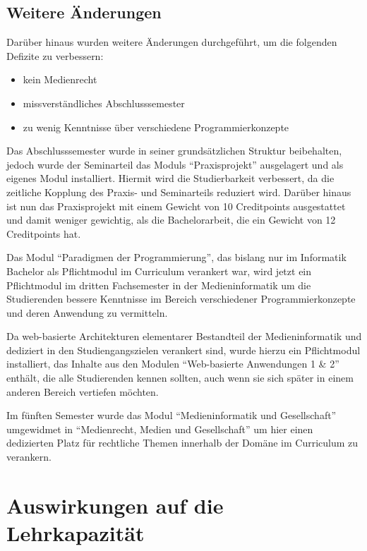 \subsection{Weitere Änderungen}\label{weitere-uxe4nderungen}

Darüber hinaus wurden weitere Änderungen durchgeführt, um die folgenden
Defizite zu verbessern:

\begin{itemize}
\tightlist
\item
  kein Medienrecht
\item
  missverständliches Abschlusssemester
\item
  zu wenig Kenntnisse über verschiedene Programmierkonzepte
\end{itemize}

Das Abschlusssemester wurde in seiner grundsätzlichen Struktur
beibehalten, jedoch wurde der Seminarteil das Moduls ``Praxisprojekt''
ausgelagert und als eigenes Modul installiert. Hiermit wird die
Studierbarkeit verbessert, da die zeitliche Kopplung des Praxis- und
Seminarteils reduziert wird. Darüber hinaus ist nun das Praxisprojekt
mit einem Gewicht von 10 Creditpoints ausgestattet und damit weniger
gewichtig, als die Bachelorarbeit, die ein Gewicht von 12 Creditpoints
hat.

Das Modul ``Paradigmen der Programmierung'', das bislang nur im
Informatik Bachelor als Pflichtmodul im Curriculum verankert war, wird
jetzt ein Pflichtmodul im dritten Fachsemester in der Medieninformatik
um die Studierenden bessere Kenntnisse im Bereich verschiedener
Programmierkonzepte und deren Anwendung zu vermitteln.

Da web-basierte Architekturen elementarer Bestandteil der
Medieninformatik und dediziert in den Studiengangszielen verankert sind,
wurde hierzu ein Pflichtmodul installiert, das Inhalte aus den Modulen
``Web-basierte Anwendungen 1 \& 2'' enthält, die alle Studierenden
kennen sollten, auch wenn sie sich später in einem anderen Bereich
vertiefen möchten.

Im fünften Semester wurde das Modul ``Medieninformatik und
Gesellschaft'' umgewidmet in ``Medienrecht, Medien und Gesellschaft'' um
hier einen dedizierten Platz für rechtliche Themen innerhalb der Domäne
im Curriculum zu verankern.

\section{Auswirkungen auf die
Lehrkapazität}\label{auswirkungen-auf-die-lehrkapazituxe4t}

